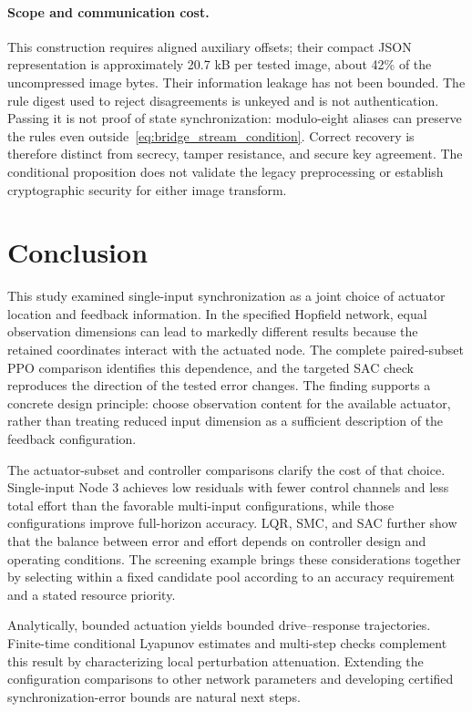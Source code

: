 \documentclass[a4paper,fleqn]{cas-dc}
\theoremstyle{plain}
\theoremstyle{definition}
\begin{document}
\paragraph{Scope and communication cost.}
This construction requires aligned auxiliary offsets; their compact JSON representation is approximately 20.7 kB per tested image, about 42\% of the uncompressed image bytes. Their information leakage has not been bounded. The rule digest used to reject disagreements is unkeyed and is not authentication. Passing it is not proof of state synchronization: modulo-eight aliases can preserve the rules even outside~\eqref{eq:bridge_stream_condition}. Correct recovery is therefore distinct from secrecy, tamper resistance, and secure key agreement. The conditional proposition does not validate the legacy preprocessing or establish cryptographic security for either image transform.

\section{Conclusion}
\label{sec:conclusion}

This study examined single-input synchronization as a joint choice of actuator location and feedback information. In the specified Hopfield network, equal observation dimensions can lead to markedly different results because the retained coordinates interact with the actuated node. The complete paired-subset PPO comparison identifies this dependence, and the targeted SAC check reproduces the direction of the tested error changes. The finding supports a concrete design principle: choose observation content for the available actuator, rather than treating reduced input dimension as a sufficient description of the feedback configuration.

The actuator-subset and controller comparisons clarify the cost of that choice. Single-input Node 3 achieves low residuals with fewer control channels and less total effort than the favorable multi-input configurations, while those configurations improve full-horizon accuracy. LQR, SMC, and SAC further show that the balance between error and effort depends on controller design and operating conditions. The screening example brings these considerations together by selecting within a fixed candidate pool according to an accuracy requirement and a stated resource priority.

Analytically, bounded actuation yields bounded drive--response trajectories. Finite-time conditional Lyapunov estimates and multi-step checks complement this result by characterizing local perturbation attenuation. Extending the configuration comparisons to other network parameters and developing certified synchronization-error bounds are natural next steps.
\end{document}
